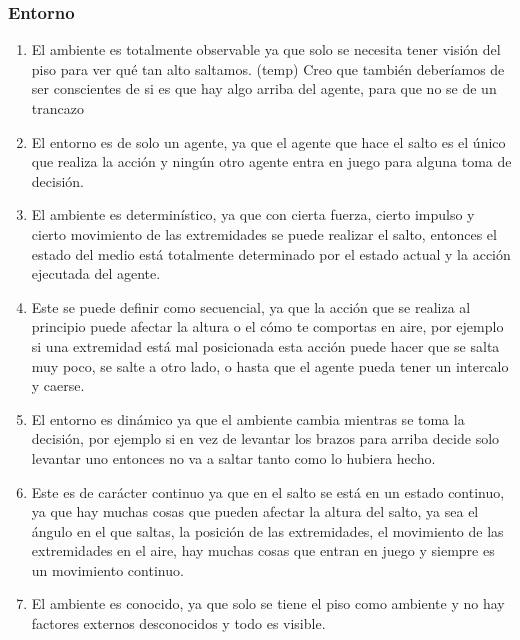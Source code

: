 \documentclass{article}
\begin{document}
            \subsubsection{Entorno}
                \begin{enumerate}
                    \item El ambiente es totalmente observable ya que solo se necesita tener visión del piso para ver qué tan alto saltamos. (temp) Creo que también deberíamos de ser conscientes de si es que hay algo arriba del agente, para que no se de un trancazo
                    \item El entorno es de solo un agente, ya que el agente que hace el salto es el único que realiza la acción y ningún otro agente entra en juego para alguna toma de decisión.
                    \item El ambiente es determinístico, ya que con cierta fuerza, cierto impulso y cierto movimiento de las extremidades se puede realizar el salto, entonces el estado del medio está totalmente determinado por el estado actual y la acción ejecutada del agente. 
                    \item Este se puede definir como secuencial, ya que la acción que se realiza al principio puede afectar la altura o el cómo te comportas en aire, por ejemplo si una extremidad está mal posicionada esta acción puede hacer que se salta muy poco, se salte a otro lado, o hasta que el agente pueda tener un intercalo y caerse.
                    \item El entorno es dinámico ya que el ambiente cambia mientras se toma la  decisión, por ejemplo si en vez de levantar los brazos para arriba decide solo levantar uno entonces no va a saltar tanto como lo hubiera hecho. 
                    \item Este es de carácter continuo ya que en el salto se está en un estado continuo, ya que hay muchas cosas que pueden afectar la altura del salto, ya sea el ángulo en el que saltas, la posición de las extremidades, el movimiento de las extremidades en el aire, hay muchas cosas que entran en juego y siempre es un movimiento continuo. 
                    \item El ambiente es conocido, ya que solo se tiene el piso como ambiente y no hay factores externos desconocidos y todo es visible. 
                \end{enumerate}
\end{document}
